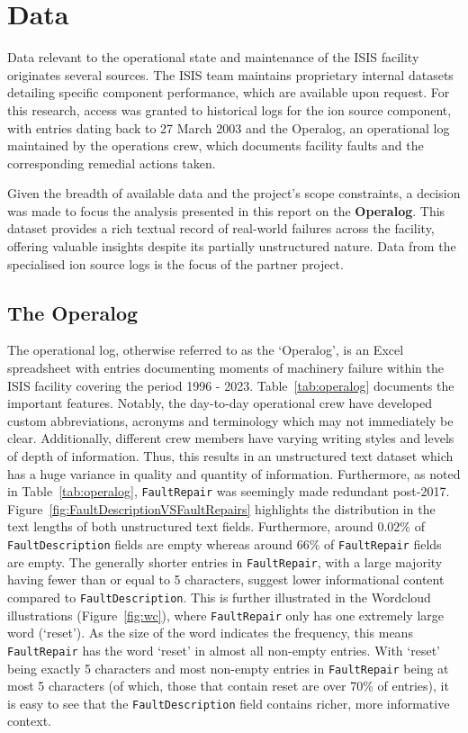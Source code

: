 \documentclass[10pt,oneside]{report}
\begin{document}
\section{Data}

Data relevant to the operational state and maintenance of the ISIS facility originates several sources. The ISIS team maintains proprietary internal datasets detailing specific component performance, which are available upon request. For this research, access was granted to historical logs for the ion source component, with entries dating back to 27 March 2003 and the Operalog, an operational log maintained by the operations crew, which documents facility faults and the corresponding remedial actions taken.

Given the breadth of available data and the project's scope constraints, a decision was made to focus the analysis presented in this report on the \textbf{Operalog}. This dataset provides a rich textual record of real-world failures across the facility, offering valuable insights despite its partially unstructured nature. Data from the specialised ion source logs is the focus of the partner project. 

\subsection{The Operalog}
The operational log, otherwise referred to as the `Operalog', is an Excel spreadsheet with entries documenting moments of machinery failure within the ISIS facility covering the period 1996 - 2023. Table~\ref{tab:operalog} documents the important features. Notably, the day-to-day operational crew have developed custom abbreviations, acronyms and terminology which may not immediately be clear. Additionally, different crew members have varying writing styles and levels of depth of information. Thus, this results in an unstructured text dataset which has a huge variance in quality and quantity of information. Furthermore, as noted in Table~\ref{tab:operalog}, \texttt{FaultRepair} was seemingly made redundant post-2017. Figure~\ref{fig:FaultDescriptionVSFaultRepairs} highlights the distribution in the text lengths of both unstructured text fields. Furthermore, around $0.02\%$ of \texttt{FaultDescription} fields are empty whereas around $66\%$ of \texttt{FaultRepair} fields are empty. The generally shorter entries in \texttt{FaultRepair}, with a large majority having fewer than or equal to 5 characters, suggest lower informational content compared to \texttt{FaultDescription}. This is further illustrated in the Wordcloud illustrations \cite{oesper2011wordcloud} (Figure~\ref{fig:wc}), where \texttt{FaultRepair} only has one extremely large word (`reset'). As the size of the word indicates the frequency, this means \texttt{FaultRepair} has the word `reset' in almost all non-empty entries. With `reset' being exactly 5 characters and most non-empty entries in \texttt{FaultRepair} being at most 5 characters (of which, those that contain reset are over 70\% of entries), it is easy to see that the \texttt{FaultDescription} field contains richer, more informative context. 
\end{document}
